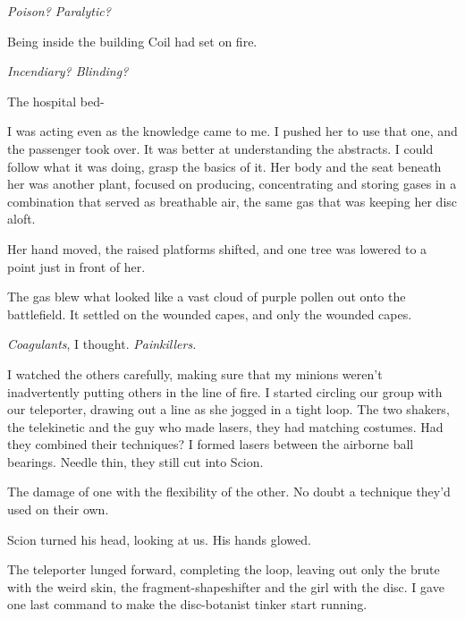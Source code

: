 \emph{Poison?  Paralytic?}



Being inside the building Coil had set on fire.



\emph{Incendiary?  Blinding?}



The hospital bed-



I was acting even as the knowledge came to me.  I pushed her to use that one, and the passenger took over.  It was better at understanding the abstracts.  I could follow what it was doing, grasp the basics of it.  Her body and the seat beneath her was another plant, focused on producing, concentrating and storing gases in a combination that served as breathable air, the same gas that was keeping her disc aloft.



Her hand moved, the raised platforms shifted, and one tree was lowered to a point just in front of her.



The gas blew what looked like a vast cloud of purple pollen out onto the battlefield.  It settled on the wounded capes, and only the wounded capes.



\emph{Coagulants}, I thought.  \emph{Painkillers.}



I watched the others carefully, making sure that my minions weren't inadvertently putting others in the line of fire.  I started circling our group with our teleporter, drawing out a line as she jogged in a tight loop.  The two shakers, the telekinetic and the guy who made lasers, they had matching costumes.  Had they combined their techniques?  I formed lasers between the airborne ball bearings.  Needle thin, they still cut into Scion.



The damage of one with the flexibility of the other.  No doubt a technique they'd used on their own.



Scion turned his head, looking at us.  His hands glowed.



The teleporter lunged forward, completing the loop, leaving out only the brute with the weird skin, the fragment-shapeshifter and the girl with the disc.  I gave one last command to make the disc-botanist tinker start running.



